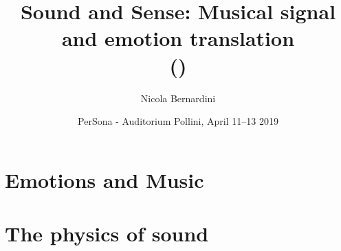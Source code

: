 \documentclass[mode=\printmode,compress,xcolor=dvipsnames]{beamer}
\title[PerSona \gitAbbrevHash]
{\small%
  Sound and Sense:
  Musical signal and emotion translation\\[-0.25\baselineskip]
	{\tiny (\rcstag)}
}
\author{%
  Nicola Bernardini\\
	{\tiny \href{mailto:\cpholderemail}{\cpholderemail}}
}
\institute[SME-CCPPD]%
{%
	\href{http://www.conservatoriopollini.it}
		 {Conservatorio ``C.Pollini'' -- Padova}
}
\date[Padova 11/04/2019]{PerSona - Auditorium Pollini, April 11--13 2019}
\begin{document}
  

\begin{frame}
	\titlepage
\end{frame}
  
\section[Emotions]{Emotions and Music}
% 
% 
% 

\section[Physics]{The physics of sound}
% 
% 
% 
% 
% 
% 
% 
% 
% 
% 
% 
\end{document}
